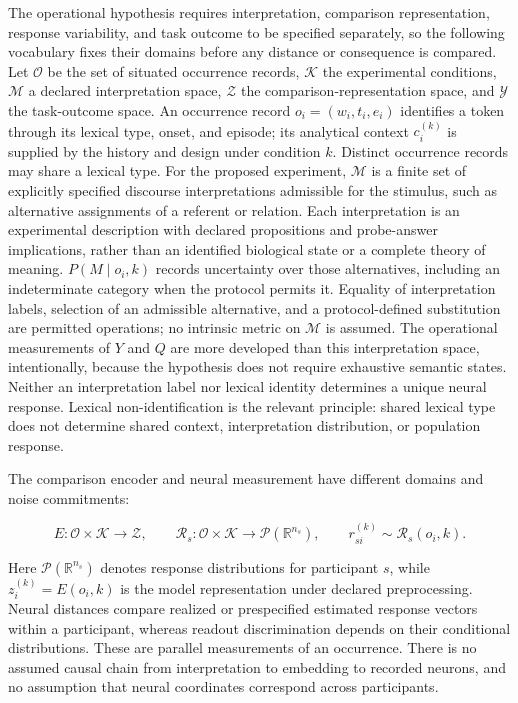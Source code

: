 \documentclass[11pt]{article}
\begin{document}
The operational hypothesis requires interpretation, comparison
representation, response variability, and task outcome to be specified
separately, so the following vocabulary fixes their domains before any
distance or consequence is compared. Let \(\mathcal O\) be the set of
situated occurrence records, \(\mathcal K\) the experimental conditions,
\(\mathcal M\) a declared interpretation space, \(\mathcal Z\) the
comparison-representation space, and \(\mathcal Y\) the task-outcome
space. An occurrence record \(o_i=(w_i,t_i,e_i)\) identifies a token
through its lexical type, onset, and episode; its analytical context
\(c_i^{(k)}\) is supplied by the history and design under condition
\(k\). Distinct occurrence records may share a lexical type. For the
proposed experiment, \(\mathcal M\) is a finite set of explicitly
specified discourse interpretations admissible for the stimulus, such as
alternative assignments of a referent or relation. Each interpretation
is an experimental description with declared propositions and
probe-answer implications, rather than an identified biological state or
a complete theory of meaning. \(P(M\mid o_i,k)\) records uncertainty
over those alternatives, including an indeterminate category when the
protocol permits it. Equality of interpretation labels, selection of an
admissible alternative, and a protocol-defined substitution are
permitted operations; no intrinsic metric on \(\mathcal M\) is assumed.
The operational measurements of \(Y\) and \(Q\) are more developed than
this interpretation space, intentionally, because the hypothesis does
not require exhaustive semantic states. Neither an interpretation label
nor lexical identity determines a unique neural response. Lexical
non-identification is the relevant principle: shared lexical type does
not determine shared context, interpretation distribution, or population
response.

The comparison encoder and neural measurement have different domains and
noise commitments:

\begin{equation}
E:\mathcal O\times\mathcal K\longrightarrow\mathcal Z,\qquad
\mathscr R_s:\mathcal O\times\mathcal K
\longrightarrow\mathcal P(\mathbb R^{n_s}),\qquad
r_{si}^{(k)}\sim\mathscr R_s(o_i,k).
\end{equation}

Here \(\mathcal P(\mathbb R^{n_s})\) denotes response distributions for
participant \(s\), while \(z_i^{(k)}=E(o_i,k)\) is the model
representation under declared preprocessing. Neural distances compare
realized or prespecified estimated response vectors within a
participant, whereas readout discrimination depends on their conditional
distributions. These are parallel measurements of an occurrence. There
is no assumed causal chain from interpretation to embedding to recorded
neurons, and no assumption that neural coordinates correspond across
participants.
\end{document}
